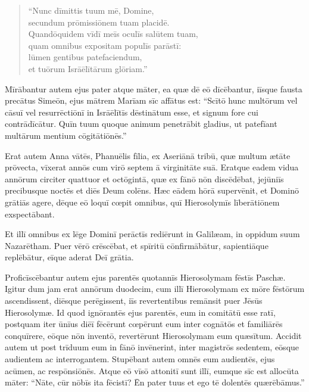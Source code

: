 \begin{verse}
\begin{patverse*}
\Versus ``Nunc dīmittis tuum mē, Domine,\\
secundum prōmissiōnem tuam placidē.\\
\Versus Quandōquidem vīdī meīs oculīs salūtem tuam,\\
\Versus quam omnibus expositam populīs parāstī:\\
\Versus lūmen gentibus patefaciendum,\\
et tuōrum Isrāēlītārum glōriam.''
\end{patverse*}
\end{verse}

\Versus Mīrābantur autem ejus pater atque māter, ea quæ dē eō dīcēbantur,
\Versus iīsque fausta precātus Simeōn, ejus mātrem Marīam sīc affātus est: ``Scītō hunc multōrum vel cāsuī vel resurrēctiōnī in Isrāēlītīs dēstinātum esse, et signum fore cui contrādīcātur.
\Versus Quīn tuum quoque animum penetrābit gladius, ut patefīant multārum mentium cōgitātiōnēs.''

\Versus Erat autem Anna vātēs, Phanuēlis fīlia, ex Aseriānā tribū, quæ multum ætāte prōvecta, vīxerat annōs cum virō septem ā virginitāte suā.
\Versus Eratque eadem vidua annōrum circiter quattuor et octōgintā, quæ ex fānō nōn discēdēbat, jejūniīs precibusque noctēs et diēs Deum colēns.
\Versus Hæc eādem hōrā supervēnit, et Dominō grātiās agere, dēque eō loquī cœpit omnibus, quī Hierosolymīs līberātiōnem exspectābant.

\Versus Et illī omnibus ex lēge Dominī perāctīs rediērunt in Galilæam, in oppidum suum Nazarētham.
\Versus Puer vērō crēscēbat, et spīritū cōnfirmābātur, sapientiāque replēbātur, eīque aderat Deī grātia.

\Versus Proficīscēbantur autem ejus parentēs quotannīs Hierosolymam fēstīs Paschæ.
\Versus Igitur dum jam erat annōrum duodecim, cum illī Hierosolymam ex mōre fēstōrum ascendissent,
\Versus diēsque perēgissent, iīs revertentibus remānsit puer Jēsūs Hierosolymæ.
\Versus Id quod ignōrantēs ejus parentēs, eum in comitātū esse ratī, postquam iter ūnīus diēī fēcērunt cœpērunt eum inter cognātōs et familiārēs conquīrere,
\Versus eōque nōn inventō, revertērunt Hierosolymam eum quæsītum.
\Versus Accidit autem ut post trīduum eum in fānō invēnerint, inter magistrōs sedentem, eōsque audientem ac interrogantem.
\Versus Stupēbant autem omnēs eum audientēs, ejus acūmen, ac respōnsiōnēs.
\Versus Atque eō vīsō attonitī sunt illī, eumque sīc est allocūta māter: ``Nāte, cūr nōbīs ita fēcistī? Ēn pater tuus et ego tē dolentēs quærēbāmus.''

